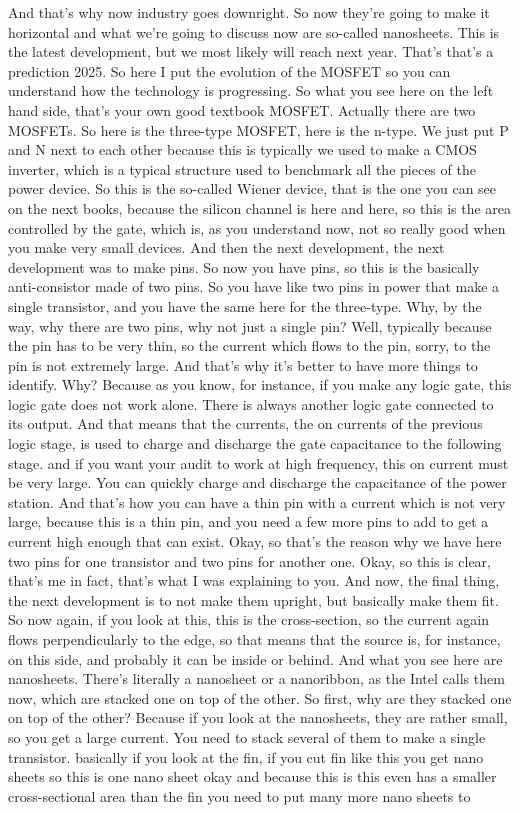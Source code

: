 And that's why now industry goes downright. So now they're going to make it horizontal and what we're going to discuss now are so-called nanosheets. This is the latest development, but we most likely will reach next year. That's that's a prediction 2025. So here I put the evolution of the MOSFET so you can understand how the technology is progressing. So what you see here on the left hand side, that's your own good textbook MOSFET. Actually there are two MOSFETs. So here is the three-type MOSFET, here is the n-type. We just put P and N next to each other because this is typically we used to make a CMOS inverter, which is a typical structure used to benchmark all the pieces of the power device. So this is the so-called Wiener device, that is the one you can see on the next books, because the silicon channel is here and here, so this is the area controlled by the gate, which is, as you understand now, not so really good when you make very small devices. And then the next development, the next development was to make pins. So now you have pins, so this is the basically anti-consistor made of two pins. So you have like two pins in power that make a single transistor, and you have the same here for the three-type. Why, by the way, why there are two pins, why not just a single pin? Well, typically because the pin has to be very thin, so the current which flows to the pin, sorry, to the pin is not extremely large. And that's why it's better to have more things to identify. Why? Because as you know, for instance, if you make any logic gate, this logic gate does not work alone. There is always another logic gate connected to its output. And that means that the currents, the on currents of the previous logic stage, is used to charge and discharge the gate capacitance to the following stage. and if you want your audit to work at high frequency, this on current must be very large. You can quickly charge and discharge the capacitance of the power station. And that's how you can have a thin pin with a current which is not very large, because this is a thin pin, and you need a few more pins to add to get a current high enough that can exist. Okay, so that's the reason why we have here two pins for one transistor and two pins for another one. Okay, so this is clear, that's me in fact, that's what I was explaining to you. And now, the final thing, the next development is to not make them upright, but basically make them fit. So now again, if you look at this, this is the cross-section, so the current again flows perpendicularly to the edge, so that means that the source is, for instance, on this side, and probably it can be inside or behind. And what you see here are nanosheets. There's literally a nanosheet or a nanoribbon, as the Intel calls them now, which are stacked one on top of the other. So first, why are they stacked one on top of the other? Because if you look at the nanosheets, they are rather small, so you get a large current. You need to stack several of them to make a single transistor. basically if you look at the fin, if you cut fin like this you get nano sheets so this is one nano sheet okay and because this is this even has a smaller cross-sectional area than the fin you need to put many more nano sheets to 